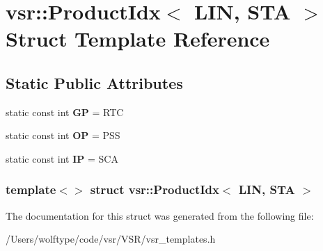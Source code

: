 \hypertarget{structvsr_1_1_product_idx_3_01_l_i_n_00_01_s_t_a_01_4}{\section{vsr\-:\-:Product\-Idx$<$ L\-I\-N, S\-T\-A $>$ Struct Template Reference}
\label{structvsr_1_1_product_idx_3_01_l_i_n_00_01_s_t_a_01_4}
}
\subsection*{Static Public Attributes}
\begin{DoxyCompactItemize}
\item 
\hypertarget{structvsr_1_1_product_idx_3_01_l_i_n_00_01_s_t_a_01_4_a8991d361fce6d54181303e080a8b401d}{static const int {\bfseries G\-P} = R\-T\-C}\label{structvsr_1_1_product_idx_3_01_l_i_n_00_01_s_t_a_01_4_a8991d361fce6d54181303e080a8b401d}

\item 
\hypertarget{structvsr_1_1_product_idx_3_01_l_i_n_00_01_s_t_a_01_4_ac64c5ad2ddcb64109c3785b1b51978a2}{static const int {\bfseries O\-P} = P\-S\-S}\label{structvsr_1_1_product_idx_3_01_l_i_n_00_01_s_t_a_01_4_ac64c5ad2ddcb64109c3785b1b51978a2}

\item 
\hypertarget{structvsr_1_1_product_idx_3_01_l_i_n_00_01_s_t_a_01_4_a2935f07e97ea303648f6f196cec1c36e}{static const int {\bfseries I\-P} = S\-C\-A}\label{structvsr_1_1_product_idx_3_01_l_i_n_00_01_s_t_a_01_4_a2935f07e97ea303648f6f196cec1c36e}

\end{DoxyCompactItemize}
\subsubsection*{template$<$$>$ struct vsr\-::\-Product\-Idx$<$ L\-I\-N, S\-T\-A $>$}



The documentation for this struct was generated from the following file\-:\begin{DoxyCompactItemize}
\item 
/\-Users/wolftype/code/vsr/\-V\-S\-R/vsr\-\_\-templates.\-h\end{DoxyCompactItemize}
